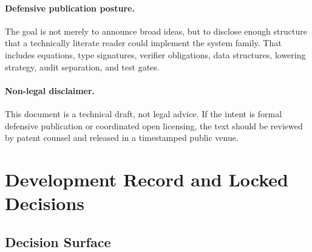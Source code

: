 \documentclass[11pt]{article}
\begin{document}
\paragraph{Defensive publication posture.}
The goal is not merely to announce broad ideas, but to disclose enough structure that a technically literate reader could implement the system family. That includes equations, type signatures, verifier obligations, data structures, lowering strategy, audit separation, and test gates.

\paragraph{Non-legal disclaimer.}
This document is a technical draft, not legal advice. If the intent is formal defensive publication or coordinated open licensing, the text should be reviewed by patent counsel and released in a timestamped public venue.

\section{Development Record and Locked Decisions}

\subsection{Decision Surface}
\end{document}
